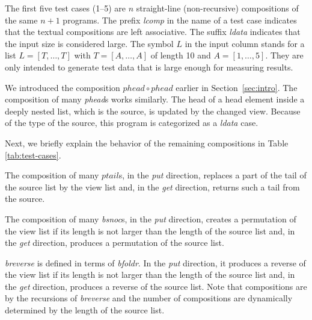 The first five test cases
(1--5) 
are $n$ straight-line (non-recursive) compositions of the same $n + 1$ 
programs.
The prefix \textit{lcomp} in the name of a test case indicates that the textual compositions are left associative.
The suffix \textit{ldata} indicates that the input size is considered large. The symbol $L$ in the input column 
stands for a list $L = [T,\ldots,T]$ with
$T = [A,\ldots,A]$ of length 10
and
$A = [1,\ldots,5]$. 
They are only intended to generate test data that is large enough for 
measuring
results. 

We introduced the composition $phead \circ phead$ earlier in Section~\ref{sec:intro}. The composition of many \textit{phead}s 
works similarly. The head of a head element inside a 
deeply nested list, which 
is the source, 
is updated by the changed view. Because of the type of the source, this program is 
categorized as a \textit{ldata} case. 

Next, we briefly explain the behavior of the remaining compositions in 
\mbox{Table\,\ref{tab:test-cases}.}%

The composition of many $ptail$s, in the \textit{put} direction, replaces a part of the tail of the source list by the view list and, in the \textit{get} direction, returns such a tail from the source.

The composition of many \textit{bsnoc}s, in the \textit{put} direction, creates a permutation of the view list if its length is not larger than the length of the source list and, in the \textit{get} direction, produces a permutation of the source list.

\textit{breverse} is defined in terms of \textit{bfoldr}. In the \textit{put} direction, it produces a reverse of the view list if its length is not larger than the length of the source list and, in the \textit{get} direction, produces a reverse of the source list. Note that compositions are by the recursions of \textit{breverse} and 
the number of compositions are dynamically determined by the length of the source list.

